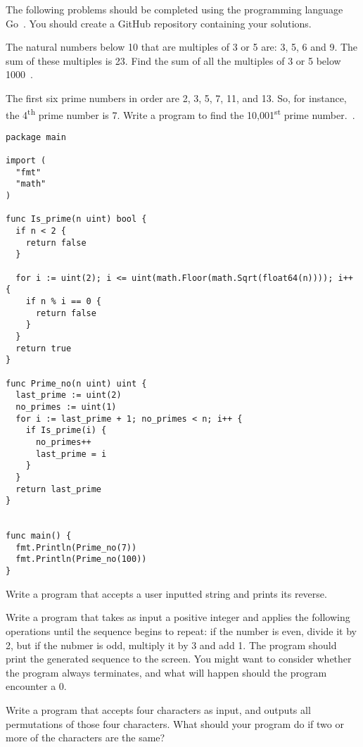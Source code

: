 

\noindent
The following problems should be completed using the programming language Go~\cite{gowebsite}.
You should create a GitHub repository containing your solutions.


\begin{questions}


\question
The natural numbers below 10 that are multiples of 3 or 5 are: 3, 5, 6 and 9.
The sum of these multiples is 23.
Find the sum of all the multiples of 3 or 5 below 1000~\cite{projecteuler}.
\begin{solution}
\end{solution}


\question
The first six prime numbers in order are 2, 3, 5, 7, 11, and 13.
So, for instance, the 4\textsuperscript{th} prime number is 7.
Write a program to find the 10,001\textsuperscript{st} prime number.~\cite{projecteuler}.
\begin{solution}
\begin{verbatim}
package main

import (
  "fmt"
  "math"
)

func Is_prime(n uint) bool {
  if n < 2 {
    return false
  }
  
  for i := uint(2); i <= uint(math.Floor(math.Sqrt(float64(n)))); i++ {
    if n % i == 0 {
      return false
    }
  }
  return true
}

func Prime_no(n uint) uint {
  last_prime := uint(2)
  no_primes := uint(1)
  for i := last_prime + 1; no_primes < n; i++ {
    if Is_prime(i) {
      no_primes++
      last_prime = i
    }
  }
  return last_prime
}


func main() {
  fmt.Println(Prime_no(7))
  fmt.Println(Prime_no(100))
}
\end{verbatim}
\end{solution}


\question
Write a program that accepts a user inputted string and prints its reverse.
\begin{solution}
\end{solution}


\question
Write a program that takes as input a positive integer and applies the following operations until the sequence begins to repeat: if the number is even, divide it by 2, but if the nubmer is odd, multiply it by 3 and add 1.
The program should print the generated sequence to the screen.
You might want to consider whether the program always terminates, and what will happen should the program encounter a 0. 
\begin{solution}
\end{solution}


\question
Write a program that accepts four characters as input, and outputs all permutations of those four characters.
What should your program do if two or more of the characters are the same?
\begin{solution}
\end{solution}


\end{questions}

